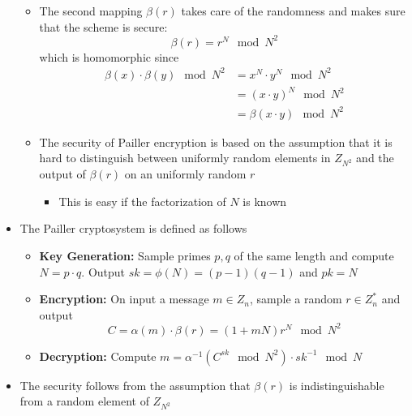 \begin{itemize}
\begin{itemize}
        \item The second mapping $\beta(r)$ takes care of the randomness and makes sure that the scheme is secure:
        \begin{equation*}
            \beta(r) = r^N \mod N^2
        \end{equation*}
        which is homomorphic since
        \begin{align*}
            \beta(x) \cdot \beta(y) \mod N^2 &= x^N \cdot y^N \mod N^2 \\
                                             &= (x \cdot y)^N \mod N^2 \\
                                             &= \beta(x \cdot y) \mod N^2
        \end{align*}
        \item The security of Pailler encryption is based on the assumption that it is hard to distinguish between uniformly random elements in $Z_{N^2}$ and the output of $\beta(r)$ on an uniformly random $r$
        \begin{itemize}
            \item This is easy if the factorization of $N$ is known
        \end{itemize}
    \end{itemize}
    \item The Pailler cryptosystem is defined as follows
    \begin{itemize}
        \item \textbf{Key Generation:} Sample primes $p,q$ of the same length and compute $N = p \cdot q$. Output $sk = \phi(N) = (p-1)(q-1)$ and $pk = N$
        \item \textbf{Encryption:} On input a message $m \in Z_n$, sample a random $r \in Z_n^*$ and output
        \begin{equation*}
            C = \alpha(m) \cdot \beta(r) = (1 + m N) r^N \mod N^2
        \end{equation*}
    \item \textbf{Decryption:} Compute $m = \alpha^{-1}(C^{sk} \mod N^2) \cdot sk^{-1} \mod N$
    \end{itemize}
    \item The security follows from the assumption that $\beta(r)$ is indistinguishable from a random element of $Z_{N^2}$

\end{itemize}


